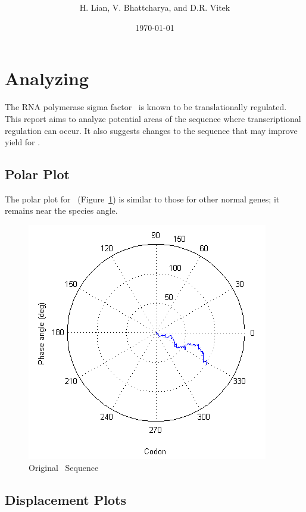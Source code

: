 \documentclass[10pt,twocolumn,draft]{article}
\begin{document}
\title{{\bf \rpoS}}
\author{{\sc H. Lian, V. Bhattcharya, and D.R. Vitek}}
\date{{\sc \today}}
\maketitle

\section{Analyzing \rpoS}

The RNA polymerase sigma factor \rpoS\ is known to be translationally regulated.
This report aims to analyze potential areas of the sequence where transcriptional regulation can occur.
It also suggests changes to the sequence that may improve yield for \rpoS.

\subsection{Polar Plot}

The polar plot for \rpoS\ (Figure~\ref{rpos:polar}) is similar to those for other normal genes; 
it remains near the species angle.

\begin{figure}[htp]
    \centering
    \caption{Original \rpoS\ Sequence}
    \label{rpos:polar}
    \includegraphics[scale=0.7]{rpoS/polar.png}
\end{figure}

\subsection{Displacement Plots}
\end{document}
